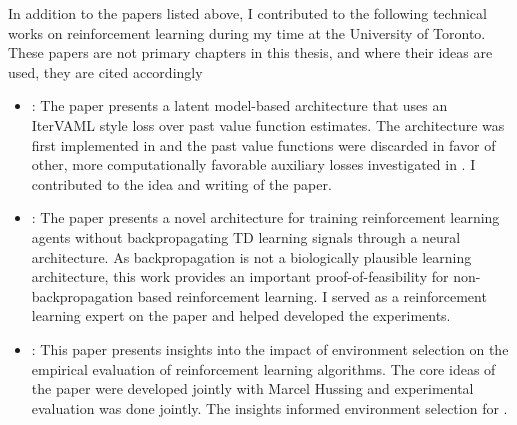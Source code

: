 In addition to the papers listed above, I contributed to the following technical works on reinforcement learning during my time at the University of Toronto. These papers are not primary chapters in this thesis, and where their ideas are used, they are cited accordingly
\begin{itemize}
	\item {}: The paper presents a latent model-based architecture that uses an IterVAML \parencite{itervaml} style loss over past value function estimates. The architecture was first implemented in \textcite{voelcker2023lambda,voelcker2025mad,voelcker2025calibrated} and the past value functions were discarded in favor of other, more computationally favorable auxiliary losses investigated in \textcite{voelcker2024when}.
	I contributed to the idea and writing of the paper.
	\item {}: The paper presents a novel architecture for training reinforcement learning agents without backpropagating TD learning signals through a neural architecture.
	As backpropagation is not a biologically plausible learning architecture, this work provides an important proof-of-feasibility for non-backpropagation based reinforcement learning.
    I served as a reinforcement learning expert on the paper and helped developed the experiments.
	\item {}: This paper presents insights into the impact of environment selection on the empirical evaluation of reinforcement learning algorithms.
	The core ideas of the paper were developed jointly with Marcel Hussing and experimental evaluation was done jointly.
    The insights informed environment selection for \textcite{voelcker2025mad}.
\end{itemize}
